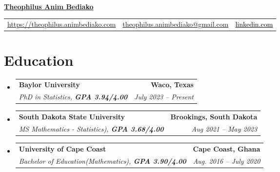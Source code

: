 \documentclass[letterpaper,11pt]{article}
\makeatletter
\newcommand{\resumeSubheadingnobullet}[4]{
	\vspace{-1pt}\item[]
	\begin{tabular*}{0.97\textwidth}[t]{l@{\extracolsep{\fill}}r}
		\textbf{#1} & \textbf{#2} \\
		\textit{\small#3} & \textit{\small #4} \\
	\end{tabular*}\vspace{-5pt}
}
\newcommand{\resumeSubHeadingListStart}{\begin{itemize}[leftmargin=0pt]}
\newcommand{\resumeSubHeadingListEnd}{\end{itemize}}
\makeatother
\begin{document}
\begin{center}
	\textbf{\href{https://theoanim.github.io/}{\huge Theophilus Anim Bediako}}\\
	\begin{tabular}{c c c}
			\faGlobe\enspace\href{https://theoanim.github.io/}{https://theophilus.animbediako.com}\quad \textbar%
			&\; \faEnvelopeO\enspace \href{mailto:theophilus.animbediako@gmail.com}{theophilus.animbediako@gmail.com} \quad
			&\textbar \quad \faLinkedinSquare\;  \href{https://www.linkedin.com/in/theophilus-anim-bediako-172093206/}{\textcolor{black}{linkedin.com}}\\
	\end{tabular}
\end{center}



%

\section{Education}
  \resumeSubHeadingListStart
    \resumeSubheadingnobullet
      {Baylor University}{Waco, Texas}
      {PhD in Statistics, \textbf{GPA 3.94/4.00}}{July 2023 -- Present}
     \resumeSubheadingnobullet
      {South Dakota State University}{Brookings, South Dakota}
      {MS Mathematics - Statistics), \textbf{GPA 3.68/4.00} }{Aug 2021 -- May 2023}
    \resumeSubheadingnobullet
      {University of Cape Coast}{Cape Coast, Ghana}
      {Bachelor of Education(Mathematics), \textbf{GPA 3.90/4.00}}{Aug. 2016 -- July 2020}
  \resumeSubHeadingListEnd
\end{document}
